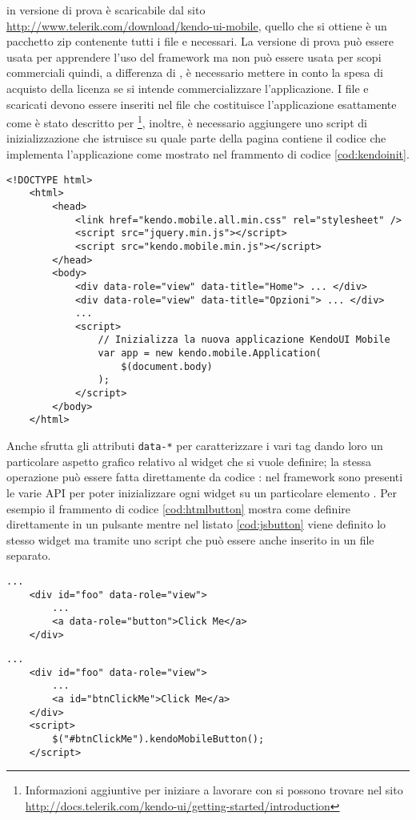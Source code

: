			\kendomob{} in versione di prova è scaricabile dal sito 
			\url{http://www.telerik.com/download/kendo-ui-mobile}, quello che si 
			ottiene è un pacchetto zip contenente tutti i file \js{} e \css{} 
			necessari. La versione di prova	può essere usata per apprendere
			l'uso del framework ma non può essere usata per scopi commerciali 
			quindi, a differenza di \jqm{}, è necessario	mettere in conto
			la spesa di acquisto della licenza se si intende commercializzare
			l'applicazione.	I file \js{} e \css{} scaricati devono essere
			inseriti nel file \html{} che costituisce l'applicazione esattamente
			come è stato descritto per \jqm{}\footnote{Informazioni
			aggiuntive per iniziare a lavorare con \kendomob{} si possono
			trovare nel sito \url{http://docs.telerik.com/kendo-ui/getting-started/introduction}},
			inoltre, è necessario aggiungere uno script di inizializzazione che
			istruisce \kendomob{} su quale parte della pagina \html{} contiene il
			codice che implementa l'applicazione come mostrato nel frammento di
			codice \ref{cod:kendoinit}.
			\begin{lstlisting}[label={cod:kendoinit},caption={Esempio di inizializzazione di un'applicazione KendoUI Mobile}]
	<!DOCTYPE html>
	<html>
		<head>
			<link href="kendo.mobile.all.min.css" rel="stylesheet" />
			<script src="jquery.min.js"></script>
			<script src="kendo.mobile.min.js"></script>
		</head>
		<body>
			<div data-role="view" data-title="Home"> ... </div>
			<div data-role="view" data-title="Opzioni"> ... </div>
			...
			<script>
				// Inizializza la nuova applicazione KendoUI Mobile
				var app = new kendo.mobile.Application(
					$(document.body)
				);
			</script>
		</body>
	</html>
			\end{lstlisting} 
			Anche \kendomob{} sfrutta gli attributi \verb|data-*| per
			caratterizzare i vari tag \html{} dando loro un particolare aspetto
			grafico relativo al widget che si vuole definire; la stessa
			operazione può essere fatta direttamente da codice \js{}: nel
			framework sono presenti le varie API per poter inizializzare ogni
			widget su un particolare elemento \html{}. Per esempio il frammento di
			codice \ref{cod:htmlbutton} mostra come definire direttamente in
			\html{} un pulsante \kendomob{} mentre nel listato \ref{cod:jsbutton}
			viene definito lo stesso widget ma tramite uno script \js{} che
			può essere anche inserito in un file separato.
			\begin{lstlisting}[caption={Definizione di un bottone KendoUI Mobile in HTML tramite attributo data-*.},label={cod:htmlbutton}]
	...
	<div id="foo" data-role="view">
		...
		<a data-role="button">Click Me</a>
	</div>
			\end{lstlisting}
			\begin{lstlisting}[caption={Definizione di un bottone KendoUI Mobile in JavaScript tramite l'uso delle apposite API.},label={cod:jsbutton}]
	...
	<div id="foo" data-role="view">
		...
		<a id="btnClickMe">Click Me</a>
	</div>
	<script>
		$("#btnClickMe").kendoMobileButton();
	</script>
			\end{lstlisting}
			
